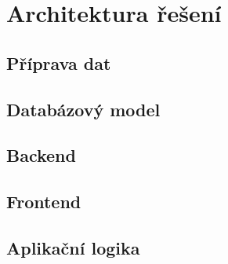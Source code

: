 
\chapter{Architektura řešení}


\section{Příprava dat}


\section{Databázový model}


\section{Backend}


\section{Frontend}


\section{Aplikační logika}